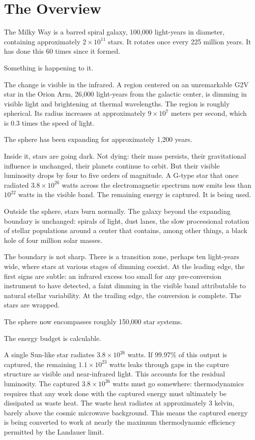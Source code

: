 \chapter{The Overview}

The Milky Way is a barred spiral galaxy, 100,000 light-years in diameter, containing approximately $2 \times 10^{11}$ stars. It rotates once every 225 million years. It has done this 60 times since it formed.

Something is happening to it.

The change is visible in the infrared. A region centered on an unremarkable G2V star in the Orion Arm, 26,000 light-years from the galactic center, is dimming in visible light and brightening at thermal wavelengths. The region is roughly spherical. Its radius increases at approximately $9 \times 10^{7}$ meters per second, which is 0.3 times the speed of light.

The sphere has been expanding for approximately 1,200 years.

Inside it, stars are going dark. Not dying: their mass persists, their gravitational influence is unchanged, their planets continue to orbit. But their visible luminosity drops by four to five orders of magnitude. A G-type star that once radiated $3.8 \times 10^{26}$ watts across the electromagnetic spectrum now emits less than $10^{22}$ watts in the visible band. The remaining energy is captured. It is being used.

Outside the sphere, stars burn normally. The galaxy beyond the expanding boundary is unchanged: spirals of light, dust lanes, the slow processional rotation of stellar populations around a center that contains, among other things, a black hole of four million solar masses.

The boundary is not sharp. There is a transition zone, perhaps ten light-years wide, where stars at various stages of dimming coexist. At the leading edge, the first signs are subtle: an infrared excess too small for any pre-conversion instrument to have detected, a faint dimming in the visible band attributable to natural stellar variability. At the trailing edge, the conversion is complete. The stars are wrapped.

The sphere now encompasses roughly 150,000 star systems.

\bigskip

The energy budget is calculable.

A single Sun-like star radiates $3.8 \times 10^{26}$ watts. If 99.97\% of this output is captured, the remaining $1.1 \times 10^{23}$ watts leaks through gaps in the capture structure as visible and near-infrared light. This accounts for the residual luminosity. The captured $3.8 \times 10^{26}$ watts must go somewhere: thermodynamics requires that any work done with the captured energy must ultimately be dissipated as waste heat. The waste heat radiates at approximately 3 kelvin, barely above the cosmic microwave background. This means the captured energy is being converted to work at nearly the maximum thermodynamic efficiency permitted by the Landauer limit.

